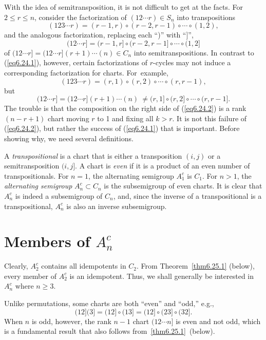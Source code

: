 \documentclass{surv-l}
\numberwithin{equation}{section}
\numberwithin{table}{section}
\numberwithin{figure}{section}
\theoremstyle{definition}
\begin{document}
With the idea of semitransposition, it is not difficult to get at
the facts. For $2\leq r\leq n$, consider the factorization of $(12\cdots
r)\in S_{n}$ into transpositions
\[
(123\cdots r)=(r-1, r)\circ(r-2, r-1)\circ\cdots\circ(1,2),
\]
and the analogous factorization, replacing each ``)'' with ``]'',
\begin{equation}\label{eq6.24.1}
(12\cdots r]=(r-1, r]\circ(r-2, r-1]\circ\cdots\circ(1,2]
\end{equation}
of $(12\cdots r]=(12\cdots r](r+1)\cdots(n) \in C_{n}$ into
semitranspositions. In contrast to (\ref{eq6.24.1}), however,
certain factorizations of $r$-cycles may not induce a
corresponding factorization for charts. For~example,
\[
(123\cdots r)=(r, 1)\circ(r, 2)\circ\cdots \circ(r, r-1),
\]
but
\begin{equation}\label{eq6.24.2}
(12\cdots r]=(12\cdots r](r+1)\cdots(n)\ \neq(r, 1]\circ(r, 2]\circ\cdots \circ (r, r-1].
\end{equation}
The trouble is that the composition on the right side of
(\ref{eq6.24.2}) is a rank $(n-r+1)$ chart moving $r$ to 1 and
fixing all $k>r$. It is not this failure of (\ref{eq6.24.2}), but
rather the success of (\ref{eq6.24.1}) that is important. Before
showing why, we need several definitions.

A \emph{transpositional} is a chart that is
either a transposition $(i,j)$ or a semitransposition $(i,j]$. A
chart is \emph{even} if it is a product of an
even number of transpositionals. For $n =1$, the alternating
semigroup $A_{1}^{c}$ is $C_{1}$. For $n >1$, the
\emph{alternating semigroup}
$A_{n}^{c}\subset C_{n}$ is the subsemigroup of even charts. It is
clear that $A_{n}^{c}$ is indeed a subsemigroup of $C_{n}$, and,
since the inverse of a transpositional is a transpositional,
$A_{n}^{c}$ is also an inverse subsemigroup.

\section{Members of $A_{n}^{c}$}\label{sec6.25}

Clearly, $A_{2}^{c}$ contains all idempotents in $C_{2}$. From
Theorem~\ref{thm6.25.1} (below), every member of $A_{2}^{c}$ is an
idempotent. Thus, we shall generally be interested in $A_{n}^{c}$
where $n \geq 3$.

Unlike permutations, some charts are both ``even'' and ``odd,'' e.g.,
\[
(12](3]=(12]\circ(13]=(12]\circ(23]\circ(32].
\]
When $n$ is odd, however, the rank $n-1$ chart $(12\cdots n]$ is
even and not odd, which is a fundamental result that also follows
from~\ref{thm6.25.1}~(below).
\end{document}
